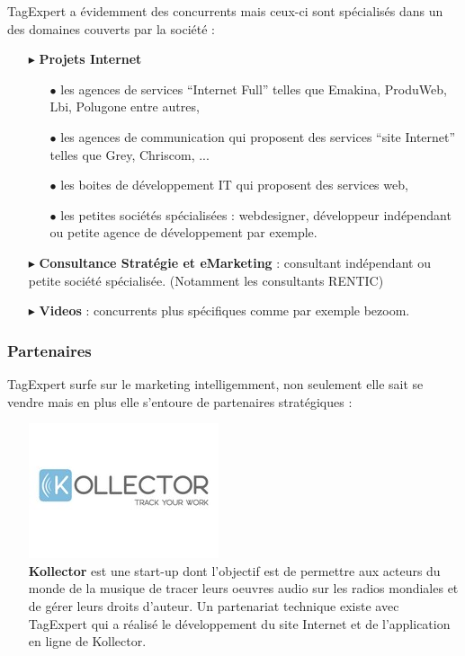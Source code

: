 \documentclass{article}
\begin{document}
\begin{sffamily}
TagExpert a évidemment des concurrents mais ceux-ci sont spécialisés dans un des domaines couverts par la société :
\begin{itemize}
\item[$\blacktriangleright$] \textbf{Projets Internet}
\begin{itemize}
\item[$\bullet$] les agences de services ``Internet Full'' telles que Emakina, ProduWeb, Lbi, Polugone entre autres,
\item[$\bullet$] les agences de communication qui proposent des services ``site Internet'' telles que Grey, Chriscom, ...
\item[$\bullet$] les boites de développement IT qui proposent des services web,
\item[$\bullet$] les petites sociétés spécialisées : webdesigner, développeur indépendant ou petite agence de développement par exemple.
\end{itemize}
\item[$\blacktriangleright$] \textbf{Consultance Stratégie et eMarketing} : consultant indépendant ou petite société spécialisée. (Notamment les consultants RENTIC)
\item[$\blacktriangleright$] \textbf{Videos} : concurrents plus spécifiques comme par exemple bezoom.
\end{itemize}  

\subsubsection{Partenaires}

TagExpert surfe sur le marketing intelligemment, non seulement elle sait se vendre mais en plus elle s'entoure de partenaires stratégiques :

\begin{itemize}
\item[] \includegraphics[scale=0.35]{kollector.jpg}\\
\textbf{Kollector} est une start-up dont l’objectif est de permettre aux acteurs du monde de la musique de tracer leurs oeuvres audio sur les radios mondiales et de gérer 
leurs droits d’auteur. Un partenariat technique existe avec TagExpert qui a réalisé le développement du site Internet et de l’application en ligne de Kollector. 


\end{itemize}
\end{sffamily}
\end{document}

